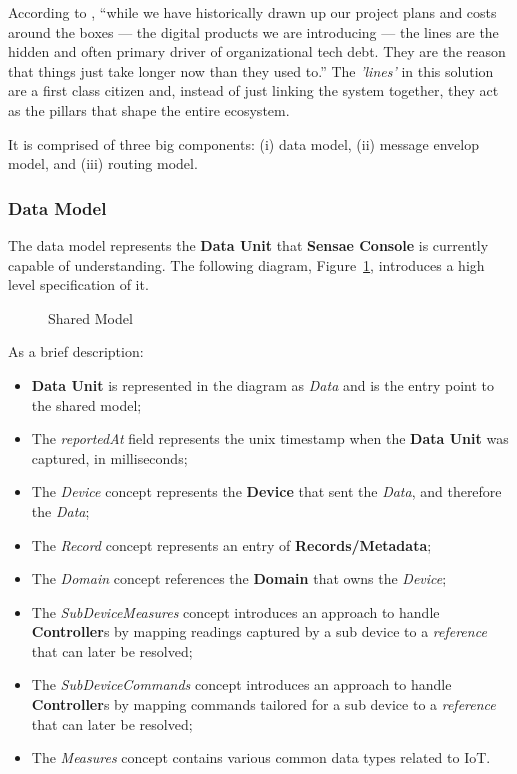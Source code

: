 According to \cite{integration}, ``while we have historically drawn up our project plans and costs around the boxes — the digital products we are introducing — the lines are the hidden and often primary driver of organizational tech debt. They are the reason that things just take longer now than they used to.'' The \textit{'lines'} in this solution are a first class citizen and, instead of just linking the system together, they act as the pillars that shape the entire ecosystem.

It is comprised of three big components: (i) data model, (ii) message envelop model, and (iii) routing model.

\subsubsection{Data Model}
\label{subsubsec:design:domain:shared_model:data}

The data model represents the \textbf{Data Unit} that \textbf{Sensae Console} is currently capable of understanding. The following diagram, Figure~\ref{fig:design:domain:shared_model:data:diagram}, introduces a high level specification of it.

\begin{figure}[H]
   \centering
  \resizebox{\columnwidth}{!}
  {
     
  }
  \caption[Shared Model]{Shared Model}
  \label{fig:design:domain:shared_model:data:diagram}
\end{figure}

As a brief description:

\begin{itemize}
   \item \textbf{Data Unit} is represented in the diagram as \textit{Data} and is the entry point to the shared model;
   \item The \textit{reportedAt} field represents the unix timestamp when the \textbf{Data Unit} was captured, in milliseconds;
   \item The \textit{Device} concept represents the \textbf{Device} that sent the \textit{Data}, and therefore the \textit{Data};
   \item The \textit{Record} concept represents an entry of \textbf{Records/Metadata};
   \item The \textit{Domain} concept references the \textbf{Domain} that owns the \textit{Device};
   \item The \textit{SubDeviceMeasures} concept introduces an approach to handle \textbf{Controller}s by mapping readings captured by a sub device to a \textit{reference} that can later be resolved;
   \item The \textit{SubDeviceCommands} concept introduces an approach to handle \textbf{Controller}s by mapping commands tailored for a sub device to a \textit{reference} that can later be resolved;
   \item The \textit{Measures} concept contains various common data types related to \gls{IoT}.
\end{itemize}

